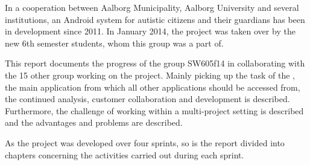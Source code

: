 In a cooperation between Aalborg Municipality, Aalborg University and several institutions, an Android system for autistic citizens and their guardians has been in development since 2011.
In January 2014, the project was taken over by the new 6th semester students, whom this group was a part of.

This report documents the progress of the group SW605f14 in collaborating with the 15 other group working on the project.
Mainly picking up the task of the \launcher, the main application from which all other applications should be accessed from, the continued analysis, customer collaboration and development is described.
Furthermore, the challenge of working within a multi-project setting is described and the advantages and problems are described.

As the project was developed over four sprints, so is the report divided into chapters concerning the activities carried out during each sprint.